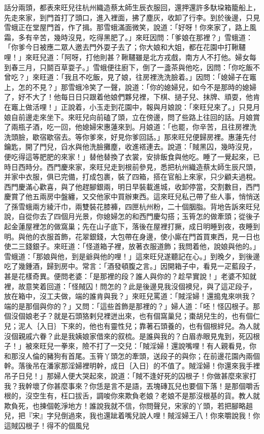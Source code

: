 \begin{showcontents}{}
話分兩頭，都表來旺兒往杭州織造蔡太師生辰衣服回，還押還許多馱垜箱籠船上，先走來家，到門首打了頭口，進入裡面，拂了塵灰，收卸了行李。到於後邊，只見雪蛾正在堂屋門首，作了揖。那雪蛾滿面微笑，說道：「好呀！你來家了，路上風霜，多有辛苦，幾時沒見，吃得黑肥了。」來旺因問：「爹娘在那裡？」雪蛾道：「你爹今日被應二眾人邀去門外耍子去了；你大娘和大姐，都在花園中打鞦韆哩！」來旺兒道：「阿呀，打他則甚？鞦韆雖是北方戎戲，南方人不打他。婦女每到春三月，只鬬百草耍子。」雪蛾便往廚下，倒了一盞茶與他吃，因問：「你吃飯不曾吃？」來旺道：「我且不吃飯，見了娘，往房裡洗洗臉着。」因問：「媳婦子在竈上，怎的不見？」那雪蛾冷笑了一聲，說道：「你的媳婦兒，如今不是那時的媳婦了，好不大了！他每日日只跟着他娘們夥兒裡，下棋、撾子兒、抹牌、頑耍，他肯在竈上做活哩！」正說着，小玉走到花園中，報與月娘說：「來旺兒來了。」只見月娘自前邊走來坐下。來旺兒向前磕了頭，立在傍邊，問了些路上往回的話。月娘賞了兩瓶子酒，吃一回，他媳婦宋惠蓮來到。月娘道：「也罷，你辛苦，且往房裡洗洗頭臉，歇宿歇宿去。等你爹來，好見你爹回話。」那來旺兒便歸房裡。惠蓮先付鑰匙，開了門兒，舀水與他洗臉攤塵，收進褡連去。說道：「賊黑囚，幾時沒見，便吃得這等肥肥的來家！」替他替換了衣裳，安排飯食與他吃。睡了一覺起來，已時日西時分。西門慶來家，來旺兒走到根前參見，悉把杭州織造蔡太師生辰尺頭，并家中衣服，俱已完備，打成包裹，裝了四箱，搭在官船上來家，只少顧夫過稅。西門慶滿心歡喜，與了他趕腳銀兩，明日早裝載進城，收卸停當，交割數目，西門慶賞了他五兩房中盤纏，又交他家中買辦東西。這來旺兒私己帶了些人事，悄悄送了孫雪蛾兩方綾汗巾，兩雙裝花膝褲，四匣杭州粉，二十個胭脂。背地告訴來旺兒說，自從你去了四個月光景，你媳婦怎的和西門慶勾搭；玉筲怎的做牽頭；從後子起金蓮屋裡怎的做窩巢；先在山子底下，落後在屋裡打撅，成日明睡到夜，夜睡到明。與他的衣服首飾，花翠銀錢，大包帶在身邊，使小廝在門首買東西，見一日也使二三錢銀子。來旺道：「怪道箱子裡，放著衣服道飾；我問着他，說娘與他的。」雪蛾道：「那娘與他，到是爺與他的哩！」這來旺兒遂聽記在心。」到晚夕，到後邊吃了幾鍾酒，歸到房中。常言：「酒發頓腹之言。」因開箱子中，看見一疋藍段子，甚是花樣奇異。便問老婆：「是那裡的段？誰人與你的？趁早實說！」老婆不知就裡，故意笑着回道：「怪賊囚！問怎的？此是後邊見我沒個襖兒，與了這疋段子，放在箱中，沒工夫做，端的誰肯與我？」來旺兒罵道：「賊淫婦！還搗鬼來哄我？端的是那個與你的？」又問：「這些首飾是那裡的？」婦人道：「呸！怪囚根子。那個沒個娘老子？就是石頭狢剌兒裡迸出來，也有個窩巢兒；棗胡兒生的，也有個仁兒；泥人｛入日｝下來的，他也有靈性兒；靠著石頭養的，也有個根絆兒。為人就沒個親戚六眷？此是我姨娘家借來的叙梳。是誰與我的？白眉赤眼見鬼到，死囚根子！」被來旺兒一拳來，險不打了一交兒：「賊淫婦！還說嘴哩！有人親看見，你和那沒人倫的豬狗有首尾。玉筲丫頭怎的牽頭，送段子的與你；在前邊花園內兩個幹。落後吊在潘家那淫婦裡明幹，成日｛入日｝的不值了。賊淫婦！你還來我手裡吊子日兒！」那婦人便大哭起來，說道：「賊不逢好死的囚根子！你做甚麼來家打我？我幹壞了你甚麼事來？你恁是言不是語，丟塊磚瓦兒也要個下落！是那個嚼舌根的，沒空生有，枉口拔舌，調唆你來欺負老娘？老娘不是那沒根基的貨。教人就欺負死，也揀個乾淨地方！誰說我就不信，你問聲兒，宋家的丫頭，若把腳略趄兒，把『宋』字兒倒過來，我也還跐着嘴兒說人哩！賊淫婦王八！你來嚼說我！你這賊囚根子！得不的個風兒
\end{showcontents}
